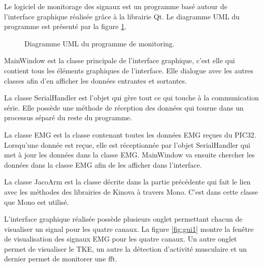 \documentclass[letterpaper, twoside, 12pt, memoire, creativecommons, hyperref]{thETS}
\begin{document}
Le logiciel de monitorage des signaux est un programme basé autour de l'interface graphique réalisée grâce à la librairie Qt. Le diagramme UML du programme est présenté par la figure \ref{fig:uml}.

\begin{figure}
	\centering
	\caption{Diagramme UML du programme de monitoring.}
	\label{fig:uml}
\end{figure}

MainWindow est la classe principale de l'interface graphique, c'est elle qui contient tous les éléments graphiques de l'interface. Elle dialogue avec les autres classes afin d'en afficher les données entrantes et sortantes. 

La classe SerialHandler est l'objet qui gère tout ce qui touche à la communication série. Elle possède une méthode de réception des données qui tourne dans un processus séparé du reste du programme.

La classe EMG est la classe contenant toutes les données EMG reçues du PIC32. Lorsqu'une donnée est reçue, elle est réceptionnée par l'objet SerialHandler qui met à jour les données dans la classe EMG. MainWindow va ensuite chercher les données dans la classe EMG afin de les afficher dans l'interface. 

La classe JacoArm est la classe décrite dans la partie précédente qui fait le lien avec les méthodes des librairies de Kinova à travers Mono. C'est dans cette classe que Mono est utilisé.

L'interface graphique réalisée possède plusieurs onglet permettant chacun de visualiser un signal pour les quatre canaux. La figure \ref{fig:gui1} montre la fenêtre de visualisation des signaux EMG pour les quatre canaux. Un autre onglet permet de visualiser le TKE, un autre la détection d'activité musculaire et un dernier permet de monitorer une fft. 
\end{document}
